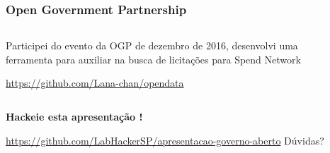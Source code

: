 \documentclass{beamer}
\newcommand{\lmr}{\fontfamily{lmr}\selectfont} %
\begin{document}
\begin{frame}
  \frametitle{Open Government Partnership}
  \begin{columns}
    \begin{column}{0.5\textwidth}
      Participei do evento da OGP de dezembro de 2016, desenvolvi uma ferramenta para auxiliar na busca de licitações para Spend Network
      
      \vspace{\baselineskip}%
      \url{https://github.com/Lana-chan/opendata}
    \end{column}
    \begin{column}{0.5\textwidth}
    \end{column}
  \end{columns}
\end{frame}

\begin{frame}
  \centering \Large
  \textbf{Hackeie esta apresentação \lmr{\LaTeX}!}\par
  \url{https://github.com/LabHackerSP/apresentacao-governo-aberto}
  \bigbreak
  Dúvidas?
\end{frame}
\end{document}
